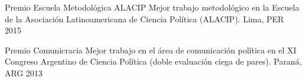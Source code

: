 \vspace{1mm}





\begin{cvhonors}
\cvhonor
{Premio Escuela Metodológica ALACIP}
{Mejor trabajo metodológico en la Escuela de la Asociación Latinoamericana de Ciencia Política (ALACIP).}
{Lima, PER}
{2015}
\end{cvhonors}

\vspace{1mm}





\begin{cvhonors}
\cvhonor
{Premio Comunicracia}
{Mejor trabajo en el área de comunicación política en el XI Congreso Argentino de Ciencia Política (doble evaluación ciega de pares).} %
{Paraná, ARG}
{2013}
\end{cvhonors}

